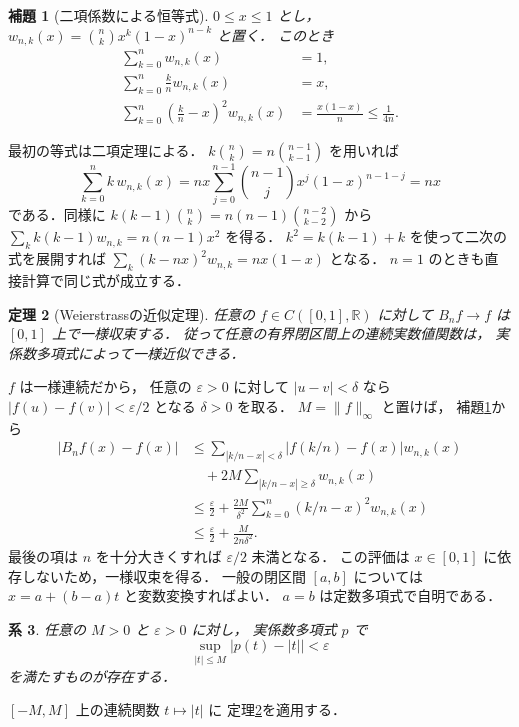 \documentclass[a5paper,10pt,onecolumn]{jsarticle}
\makeatletter
\theoremstyle{mathnotetheorem}
\newtheorem{theorem}{定理}[section]
\newtheorem{lemma}[theorem]{補題}
\newtheorem{corollary}[theorem]{系}
\renewcommand{\proofname}{証明}
\renewenvironment{proof}[1][\proofname]{%
  \par\pushQED{\qed}\normalfont\topsep4\p@\@plus2\p@\relax
  \trivlist\item[\hskip\labelsep\bfseries #1]\ignorespaces
}{\popQED\endtrivlist\@endpefalse}
\newcommand{\norm}[1]{\lVert #1\rVert}
\makeatother
\begin{document}
\begin{lemma}[二項係数による恒等式]\label{lem:binomial}
$0\le x\le1$ とし，
$w_{n,k}(x)={n\choose k}x^k(1-x)^{n-k}$ と置く．
このとき
\begin{align*}
 \sum_{k=0}^n w_{n,k}(x)&=1,\\
 \sum_{k=0}^n\frac kn w_{n,k}(x)&=x,\\
 \sum_{k=0}^n\left(\frac kn-x\right)^2w_{n,k}(x)
 &=\frac{x(1-x)}n\le\frac1{4n}.
\end{align*}
\end{lemma}
\begin{proof}
最初の等式は二項定理による．
$k{n\choose k}=n{n-1\choose k-1}$ を用いれば
\[
 \sum_{k=0}^nk\,w_{n,k}(x)
 =nx\sum_{j=0}^{n-1}{n-1\choose j}x^j(1-x)^{n-1-j}
 =nx
\]
である．同様に
$k(k-1){n\choose k}=n(n-1){n-2\choose k-2}$ から
$\sum_k k(k-1)w_{n,k}=n(n-1)x^2$ を得る．
$k^2=k(k-1)+k$ を使って二次の式を展開すれば
$\sum_k(k-nx)^2w_{n,k}=nx(1-x)$ となる．
$n=1$ のときも直接計算で同じ式が成立する．
\end{proof}

\begin{theorem}[Weierstrassの近似定理]\label{thm:weierstrass}
任意の $f\in C([0,1],\mathbb R)$ に対して
$B_nf\to f$ は $[0,1]$ 上で一様収束する．
従って任意の有界閉区間上の連続実数値関数は，
実係数多項式によって一様近似できる．
\end{theorem}
\begin{proof}
$f$ は一様連続だから，
任意の $\varepsilon>0$ に対して
$|u-v|<\delta$ なら
$|f(u)-f(v)|<\varepsilon/2$ となる $\delta>0$ を取る．
$M=\norm f_\infty$ と置けば，
補題\ref{lem:binomial}から
\begin{align*}
 |B_nf(x)-f(x)|
 &\le\sum_{|k/n-x|<\delta}
  |f(k/n)-f(x)|w_{n,k}(x)\\
 &\quad+2M\sum_{|k/n-x|\ge\delta}w_{n,k}(x)\\
 &\le\frac{\varepsilon}{2}
 +\frac{2M}{\delta^2}
   \sum_{k=0}^n(k/n-x)^2w_{n,k}(x)\\
 &\le\frac{\varepsilon}{2}+\frac{M}{2n\delta^2}.
\end{align*}
最後の項は $n$ を十分大きくすれば
$\varepsilon/2$ 未満となる．
この評価は $x\in[0,1]$ に依存しないため，一様収束を得る．
一般の閉区間 $[a,b]$ については
$x=a+(b-a)t$ と変数変換すればよい．
$a=b$ は定数多項式で自明である．
\end{proof}

\begin{corollary}\label{cor:absolute}
任意の $M>0$ と $\varepsilon>0$ に対し，
実係数多項式 $p$ で
\[
 \sup_{|t|\le M}\bigl|p(t)-|t|\bigr|<\varepsilon
\]
を満たすものが存在する．
\end{corollary}
\begin{proof}
$[-M,M]$ 上の連続関数 $t\mapsto|t|$ に
定理\ref{thm:weierstrass}を適用する．
\end{proof}
\end{document}
